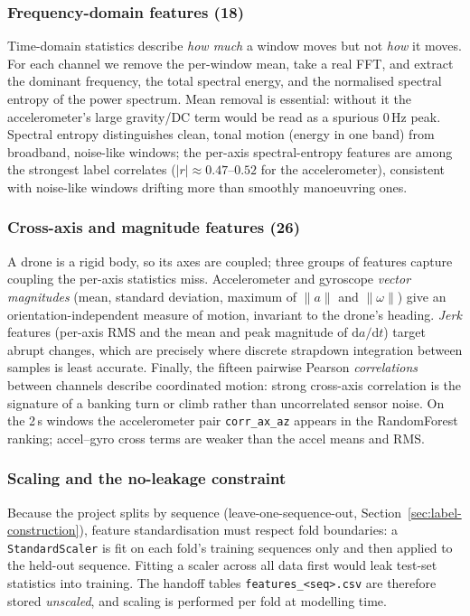 \subsubsection{Frequency-domain features (18)}
Time-domain statistics describe \emph{how much} a window moves but not
\emph{how} it moves. For each channel we remove the per-window mean, take a
real FFT, and extract the dominant frequency, the total spectral energy, and
the normalised spectral entropy of the power spectrum. Mean removal is
essential: without it the accelerometer's large gravity/DC term would be read
as a spurious $0\,\mathrm{Hz}$ peak. Spectral entropy distinguishes clean,
tonal motion (energy in one band) from broadband, noise-like windows; the
per-axis spectral-entropy features are among the strongest label correlates
($|r| \approx 0.47$--$0.52$ for the accelerometer), consistent with
noise-like windows drifting more than smoothly manoeuvring ones.

\subsubsection{Cross-axis and magnitude features (26)}
A drone is a rigid body, so its axes are coupled; three groups of features
capture coupling the per-axis statistics miss. Accelerometer and gyroscope
\emph{vector magnitudes} (mean, standard deviation, maximum of
$\lVert a \rVert$ and $\lVert \omega \rVert$) give an orientation-independent
measure of motion, invariant to the drone's heading. \emph{Jerk} features
(per-axis RMS and the mean and peak magnitude of $\mathrm{d}a/\mathrm{d}t$)
target abrupt changes, which are precisely where discrete strapdown
integration between samples is least accurate. Finally, the fifteen pairwise
Pearson \emph{correlations} between channels describe coordinated motion:
strong cross-axis correlation is the signature of a banking turn or climb
rather than uncorrelated sensor noise. On the 2\,s windows the
accelerometer pair \texttt{corr\_ax\_az} appears in the RandomForest ranking;
accel--gyro cross terms are weaker than the accel means and RMS.

\subsubsection{Scaling and the no-leakage constraint}
Because the project splits by sequence (leave-one-sequence-out,
Section~\ref{sec:label-construction}), feature standardisation must respect
fold boundaries: a \texttt{StandardScaler} is fit on each fold's training
sequences only and then applied to the held-out sequence. Fitting a scaler
across all data first would leak test-set statistics into training. The
handoff tables \texttt{features\_<seq>.csv} are therefore stored
\emph{unscaled}, and scaling is performed per fold at modelling time.

